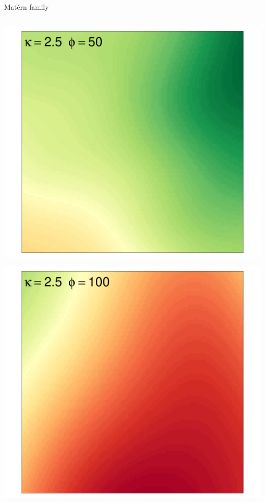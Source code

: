\documentclass[
  ignorenonframetext,
]{beamer}
\begin{document}
\begin{frame}{Matérn family}
\begin{columns}[T]
\begin{column}{0.33\textwidth}
\includegraphics{Lecture_1_files/figure-beamer/unnamed-chunk-43-1.pdf}

\includegraphics{Lecture_1_files/figure-beamer/unnamed-chunk-44-1.pdf}
\end{column}
\end{columns}
\end{frame}
\end{document}
